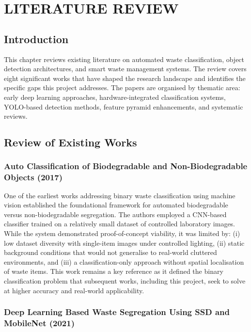 \chapter{LITERATURE REVIEW}

\section{Introduction}

This chapter reviews existing literature on automated waste classification, object detection architectures, and smart waste management systems. The review covers eight significant works that have shaped the research landscape and identifies the specific gaps this project addresses. The papers are organised by thematic area: early deep learning approaches, hardware-integrated classification systems, YOLO-based detection methods, feature pyramid enhancements, and systematic reviews.

\section{Review of Existing Works}

\subsection{Auto Classification of Biodegradable and Non-Biodegradable Objects (2017)}

One of the earliest works addressing binary waste classification using machine vision \cite{autoclassify2017} established the foundational framework for automated biodegradable versus non-biodegradable segregation. The authors employed a CNN-based classifier trained on a relatively small dataset of controlled laboratory images. While the system demonstrated proof-of-concept viability, it was limited by: (i) low dataset diversity with single-item images under controlled lighting, (ii) static background conditions that would not generalise to real-world cluttered environments, and (iii) a classification-only approach without spatial localisation of waste items. This work remains a key reference as it defined the binary classification problem that subsequent works, including this project, seek to solve at higher accuracy and real-world applicability.

\subsection{Deep Learning Based Waste Segregation Using SSD and MobileNet (2021)}

